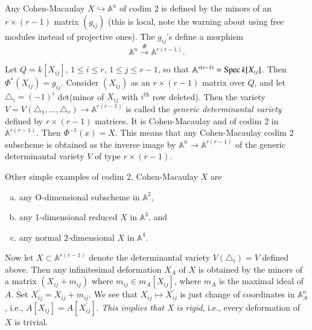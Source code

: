 {\begin{remark}\label{part1-rem5.1}%
Any Cohen-Macaulay $X\hookrightarrow \mathbb{A}^{n}$ of codim 2 is
defined by the minors of an $r\times(r-1)$ matrix $(g_{ij})$ (this is
local, note the warning about using free modules instead of projective
ones). The $g_{ij}$'s define a morphism  
$$
\mathbb{A}^{n}\xrightarrow{\Phi}\mathbb{A}^{r(r-1)}.
$$

Let $Q=k[X_{ij}]$, $1\le i \le r$, $1\le j\le r-1$, so that
$\mathbb{A}^{r(r-1)}=\operatorname{Spec} k[X_{ij}]$. Then
$\Phi^{\ast}(X_{ij})=g_{ij}$. Consider $(X_{ij})$ as an $r\times(r-1)$
matrix over $Q$, and let $\triangle_i=(-1)^{i}$  det(minor of $X_{ij}$
with $i^{\text{th}}$ row deleted). Then the variety
$V=V(\triangle_1,\ldots,\triangle_r)\to \mathbb{A}^{r(r-1)}$\pageoriginale
is called the {\em generic determinantal variety} defined by
$r\times(r-1)$ matrices. It is Cohen-Macaulay and of codim $2$ in
$\mathbb{A}^{r(r-1)}$. Then $\Phi^{-1}(x)=X$. This means that any
Cohen-Macaulay codim $2$ subscheme is obtained as the inverse image by
$\mathbb{A}^{n}\to\mathbb{A}^{r(r-1)}$ of the generic determinantal
variety $V$ of type $r\times(r-1)$. 
\end{remark}

\begin{remark}\label{part1-rem5.2}%
Other simple examples of codim $2$, Cohen-Macaulay $X$ are 
\begin{enumerate}[(a)]
\item any O-dimensional subscheme in $\mathbb{A}^{2}$,

\item any 1-dimensional reduced $X$ in $\mathbb{A}^{3}$, and

\item any normal 2-dimensional $X$ in $\mathbb{A}^{4}$.
\end{enumerate}
\end{remark}

\medskip
{}

Now let $X\subset\mathbb{A}^{r(r-1)}$ denote the determinantal variety
$V(\triangle_i)=V$ defined above. Then any infinitesimal deformation
$X_A$ of $X$ is obtained by the minors of a matrix $(X_{ij}+m_{ij})$
where $m_{ij}\in m_A[X_{ij}]$, where $m_A$ is the maximal ideal of
$A$. Set $X^{'}_{ij}=X_{ij}+m_{ij}$. We see that $X_{ij}\mapsto
X^{'}_{ij}$ is just change of coordinates in $\mathbb{A}_A^{n}$, i.e.,
$A[X_{ij}]=A[X^{'}_{ij}]$. {\em This implies that X is rigid}, i.e.,
every deformation of $X$ is trivial. 


}
